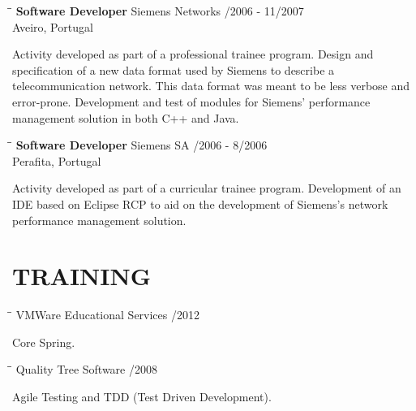 \documentclass{res}
\begin{document}
\begin{resume}
\begin{tabbing}
\hspace{2.3in}\= \hspace{2.6in}\= \kill %
{\bf Software Developer} \>Siemens Networks    
/2006 - 11/2007\\ \>Aveiro, Portugal
\end{tabbing}\vspace{-20pt}      %
Activity developed as part of a professional trainee program.
Design and specification of a new data format used by Siemens to describe a
telecommunication network. This data format was meant to be less verbose and
error-prone. Development and test of modules for Siemens' performance
management solution in both C++ and Java.

\begin{tabbing}
\hspace{2.3in}\= \hspace{2.6in}\= \kill %
{\bf Software Developer} \>Siemens SA    
/2006 - 8/2006\\ \>Perafita, Portugal
\end{tabbing}\vspace{-20pt}      %
Activity developed as part of a curricular trainee program.
Development of an IDE based on Eclipse RCP to aid on the development of
Siemens’s network performance management solution.

\section{TRAINING}

\begin{tabbing}
\hspace{2.3in}\= \hspace{2.6in}\= \kill %
{\bf } \>VMWare Educational Services    
/2012\\ \>
\end{tabbing}\vspace{-20pt}
Core Spring.

\begin{tabbing}
\hspace{2.3in}\= \hspace{2.6in}\= \kill %
{\bf } \>Quality Tree Software    
/2008\\ \>
\end{tabbing}\vspace{-20pt}
Agile Testing and TDD (Test Driven Development).


\end{resume}
\end{document}
